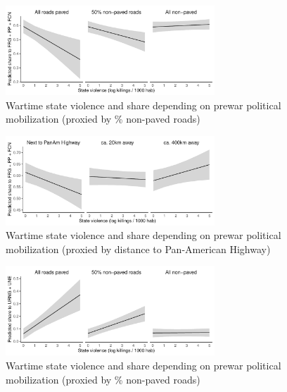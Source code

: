 \documentclass[a4paper, 12pt, notitlepage]{article}
\begin{document}



\begin{figure}[htb!]
  \centering
    \includegraphics[width = 0.7\textwidth]{img/pp_fulldcha_roads}

  \caption{Wartime state violence and {} share depending on prewar political mobilization (proxied by \% non-paved roads)} \label{fig:pp_fulldcha_roads}

\end{figure}

\begin{figure}[htb!]
  \centering
    \includegraphics[width = 0.7\textwidth]{img/pp_fulldcha_panam}

  \caption{Wartime state violence and {} share depending on prewar political mobilization (proxied by distance to Pan-American Highway)} \label{fig:pp_fulldcha_panam}

\end{figure}

\begin{figure}[htb!]
  \centering
    \includegraphics[width = 0.7\textwidth]{img/pp_fullizq_roads}

  \caption{Wartime state violence and {} share depending on prewar political mobilization (proxied by \% non-paved roads)} \label{fig:pp_fullizq_roads}

\end{figure}
\end{document}
